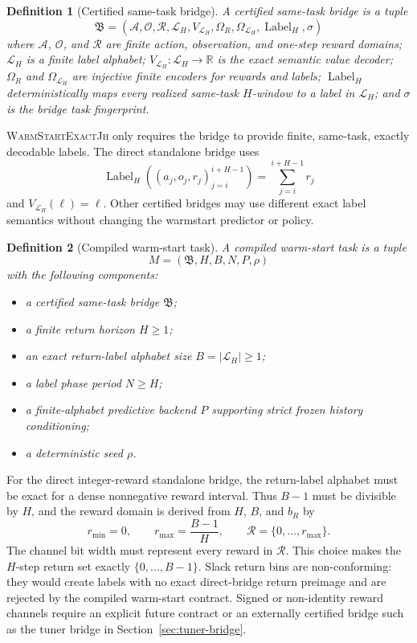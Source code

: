 \documentclass[11pt]{article}
\newtheorem{definition}{Definition}
\newcommand{\Warm}{\textnormal{\textsc{WarmStartExactJh}}}
\newcommand{\Act}{\mathcal{A}}
\newcommand{\Ospace}{\mathcal{O}}
\newcommand{\Rspace}{\mathcal{R}}
\newcommand{\Bridge}{\mathfrak{B}}
\newcommand{\Lab}{\mathcal{L}_H}
\newcommand{\Vlab}{V_{\Lab}}
\begin{document}
\begin{definition}[Certified same-task bridge]
A certified same-task bridge is a tuple
\[
\Bridge=(\Act,\Ospace,\Rspace,\Lab,\Vlab,\Omega_R,\Omega_{\Lab},
\operatorname{Label}_H,\sigma)
\]
where \(\Act\), \(\Ospace\), and \(\Rspace\) are finite action,
observation, and one-step reward domains; \(\Lab\) is a finite label
alphabet; \(\Vlab:\Lab\to\mathbb{R}\) is the exact semantic value decoder;
\(\Omega_R\) and \(\Omega_{\Lab}\) are injective finite encoders for rewards
and labels; \(\operatorname{Label}_H\) deterministically maps every realized
same-task \(H\)-window to a label in \(\Lab\); and \(\sigma\) is the bridge
task fingerprint.
\end{definition}

\Warm{} only requires the bridge to provide finite, same-task, exactly
decodable labels. The direct standalone bridge uses
\[
\operatorname{Label}_H((a_j,o_j,r_j)_{j=i}^{i+H-1})
=
\sum_{j=i}^{i+H-1}r_j
\]
and \(\Vlab(\ell)=\ell\). Other certified bridges may use different exact
label semantics without changing the warmstart predictor or policy.

\begin{definition}[Compiled warm-start task]
A compiled warm-start task is a tuple
\[
M=(\Bridge,H,B,N,P,\rho)
\]
with the following components:
\begin{itemize}
    \item a certified same-task bridge \(\Bridge\);
    \item a finite return horizon \(H\ge1\);
    \item an exact return-label alphabet size
    \(B=|\Lab|\ge1\);
    \item a label phase period \(N\ge H\);
    \item a finite-alphabet predictive backend \(P\) supporting strict frozen
    history conditioning;
    \item a deterministic seed \(\rho\).
\end{itemize}
\end{definition}

For the direct integer-reward standalone bridge, the return-label alphabet must
be exact for a dense nonnegative reward interval. Thus \(B-1\) must be
divisible by \(H\), and the reward domain is derived from \(H\), \(B\), and
\(b_R\) by
\[
r_{\min}=0,
\qquad
r_{\max}=\frac{B-1}{H},
\qquad
\Rspace=\{0,\dots,r_{\max}\}.
\]
The channel bit width must represent every reward in \(\Rspace\). This
choice makes the \(H\)-step return set exactly
\(\{0,\dots,B-1\}\). Slack return bins are non-conforming: they would create
labels with no exact direct-bridge return preimage and are rejected by the
compiled warm-start contract. Signed or non-identity reward channels require
an explicit future contract or an externally certified bridge such as the
tuner bridge in Section~\ref{sec:tuner-bridge}.
\end{document}
